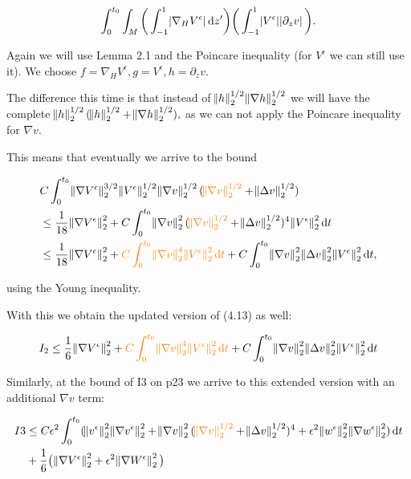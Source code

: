 \documentclass[11pt]{article}
\newcommand*\diff{\mathop{}\!\mathrm{d}}
\begin{document}
\begin{enumerate}
$$ \int_0^{t_0} \int_M \bigg ( \int_{-1}^1 \abs{\nabla_H V^\epsilon} \diff z' \bigg) \bigg ( \int_{-1}^1 \abs{V^\epsilon} \abs{\partial_z v} \bigg ).$$

Again we will use Lemma 2.1 and the Poincare inequality (for $V^\epsilon$ we can still use it). We choose $f = \nabla_H V^\epsilon, g = V^\epsilon, h = \partial_z v.$

The difference this time is that instead of $\norm{h}_2^{1/2} \norm{\nabla h}_2^{1/2}$ we will have the complete $\norm{h}_2^{1/2} (\norm{h}_2^{1/2} + \norm{\nabla h}_2^{1/2}),$ as we can not apply the Poincare inequality for $\nabla v.$ 

This means that eventually we arrive to the bound

\begin{equation}
  \begin{split}
     & C \int_0^{t_0} \norm{\nabla V^\epsilon}_2^{3/2} \norm{V^\epsilon}_2^{1/2} \norm{\nabla v}_2^{1/2} (\textcolor{orange}{\norm{\nabla v}_2^{1/2}} + \norm{\Delta v}_2^{1/2})  \\
     & \leq \frac{1}{18} \norm{\nabla V^\epsilon}^2_2 + C \int_0^{t_0} \norm{\nabla v}_2^2 (\textcolor{orange}{\norm{\nabla v}_2^{1/2}} + \norm{\Delta v}_2^{1/2})^4 \norm{V^\epsilon}_2^2 \diff t \\
     & \leq \frac{1}{18} \norm{\nabla V^\epsilon}^2_2 + \textcolor{orange}{C \int_0^{t_0} \norm{\nabla v}_2^4 \norm{V^\epsilon}_2^2 \diff t} + C \int_0^{t_0} \norm{\nabla v}_2^2  \norm{\Delta v}_2^2 \norm{V^\epsilon}_2^2 \diff t,
  \end{split}
\end{equation}

using the Young inequality.

With this we obtain the updated version of (4.13) as well:

$$ I_2 \leq \frac{1}{6} \norm{\nabla V^\epsilon}^2_2 + \textcolor{orange}{C \int_0^{t_0} \norm{\nabla v}_2^4 \norm{V^\epsilon}_2^2 \diff t} + C \int_0^{t_0} \norm{\nabla v}_2^2  \norm{\Delta v}_2^2 \norm{V^\epsilon}_2^2 \diff t$$

Similarly, at the bound of I3 on p23 we arrive to this extended version with an additional $\nabla v$ term:

\begin{equation}
  \begin{split} \nonumber
    I3 & \leq C \epsilon^2 \int_0 ^ {t_0} ( \norm{v^\epsilon}_2^2 \norm{\nabla v^\epsilon}_2^2 + \norm{\nabla v}_2^2 (\textcolor{orange}{\norm{\nabla v}_2^{1/2}} + \norm{\Delta v}_2^{1/2})^4 + \epsilon^2 \norm{w^\epsilon}_2^2 \norm{\nabla w^\epsilon}_2^2 ) \diff t \\
    & + \frac{1}{6} \big ( \norm{\nabla V^\epsilon}_2^2 + \epsilon^2 \norm{\nabla W^\epsilon}_2^2  \big)
  \end{split}
\end{equation}


\end{enumerate}
\end{document}
